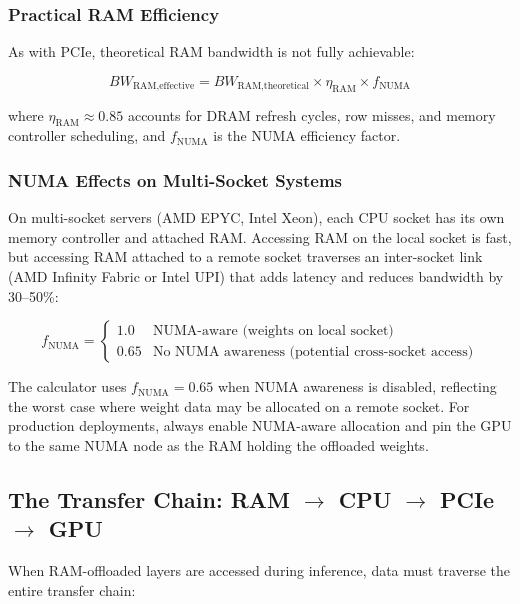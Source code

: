 \documentclass[11pt,a4paper]{article}
\theoremstyle{definition}
\begin{document}
\subsubsection{Practical RAM Efficiency}

As with PCIe, theoretical RAM bandwidth is not fully achievable:

\begin{equation}\label{eq:ram_effective}
BW_{\text{RAM,effective}} = BW_{\text{RAM,theoretical}} \times \eta_{\text{RAM}} \times f_{\text{NUMA}}
\end{equation}

where $\eta_{\text{RAM}} \approx 0.85$ accounts for DRAM refresh cycles, row misses, and memory controller scheduling, and $f_{\text{NUMA}}$ is the NUMA efficiency factor.

\subsubsection{NUMA Effects on Multi-Socket Systems}

On multi-socket servers (AMD EPYC, Intel Xeon), each CPU socket has its own memory controller and attached RAM. Accessing RAM on the local socket is fast, but accessing RAM attached to a remote socket traverses an inter-socket link (AMD Infinity Fabric or Intel UPI) that adds latency and reduces bandwidth by 30--50\%:

\begin{equation}\label{eq:numa}
f_{\text{NUMA}} = \begin{cases} 1.0 & \text{NUMA-aware (weights on local socket)} \\ 0.65 & \text{No NUMA awareness (potential cross-socket access)} \end{cases}
\end{equation}

The calculator uses $f_{\text{NUMA}} = 0.65$ when NUMA awareness is disabled, reflecting the worst case where weight data may be allocated on a remote socket. For production deployments, always enable NUMA-aware allocation and pin the GPU to the same NUMA node as the RAM holding the offloaded weights.

\subsection{The Transfer Chain: RAM $\to$ CPU $\to$ PCIe $\to$ GPU}

When RAM-offloaded layers are accessed during inference, data must traverse the entire transfer chain:
\end{document}
